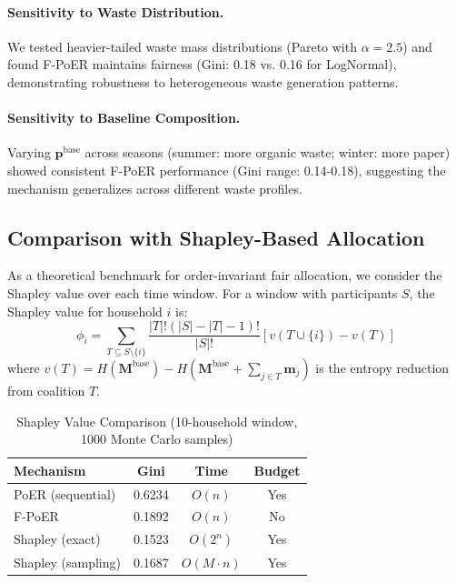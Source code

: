 \documentclass[12pt,a4paper]{article}
\begin{document}
\paragraph{Sensitivity to Waste Distribution.} We tested heavier-tailed waste mass distributions (Pareto with $\alpha=2.5$) and found F-PoER maintains fairness (Gini: 0.18 vs. 0.16 for LogNormal), demonstrating robustness to heterogeneous waste generation patterns.

\paragraph{Sensitivity to Baseline Composition.} Varying $\mathbf{p}^{\text{base}}$ across seasons (summer: more organic waste; winter: more paper) showed consistent F-PoER performance (Gini range: 0.14-0.18), suggesting the mechanism generalizes across different waste profiles.

\subsection{Comparison with Shapley-Based Allocation}

As a theoretical benchmark for order-invariant fair allocation, we consider the Shapley value\cite{shapley1953value} over each time window. For a window with participants $S$, the Shapley value for household $i$ is:
\begin{equation}
\phi_i = \sum_{T \subseteq S \setminus \{i\}} \frac{|T|! (|S|-|T|-1)!}{|S|!} \left[ v(T \cup \{i\}) - v(T) \right]
\end{equation}
where $v(T) = H(\mathbf{M}^{\text{base}}) - H(\mathbf{M}^{\text{base}} + \sum_{j \in T} \mathbf{m}_j)$ is the entropy reduction from coalition $T$.

\begin{table}[h]
\centering
\caption{Shapley Value Comparison (10-household window, 1000 Monte Carlo samples)}
\label{tab:shapley}
\begin{tabular}{@{}lccc@{}}
\toprule
\textbf{Mechanism} & \textbf{Gini} & \textbf{Time} & \textbf{Budget} \\
\midrule
PoER (sequential) & 0.6234 & $O(n)$ & Yes \\
F-PoER & 0.1892 & $O(n)$ & No \\
Shapley (exact) & 0.1523 & $O(2^n)$ & Yes \\
Shapley (sampling) & 0.1687 & $O(M \cdot n)$ & Yes \\
\bottomrule
\end{tabular}
\end{table}
\end{document}
